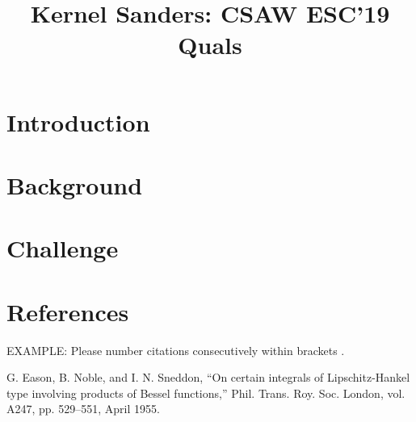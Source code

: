 \documentclass[conference]{IEEEtran}
\begin{document}
\title{Kernel Sanders: CSAW {ESC'19} Quals\\
}

\author{
}

\maketitle


\section{Introduction}


\section{Background}


\section{Challenge}


\section*{References}

EXAMPLE: Please number citations consecutively within brackets \cite{b1}.

\begin{thebibliography}{00}
 G. Eason, B. Noble, and I. N. Sneddon, ``On certain integrals of Lipschitz-Hankel type involving products of Bessel functions,'' Phil. Trans. Roy. Soc. London, vol. A247, pp. 529--551, April 1955.
\end{thebibliography}
\vspace{12pt}
\end{document}
